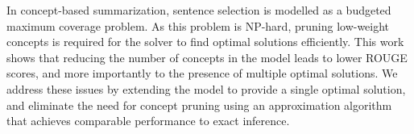 In concept-based summarization, sentence selection is modelled as a budgeted maximum coverage problem. As this problem is NP-hard, pruning low-weight concepts is required for the solver to find optimal solutions efficiently. This work shows that reducing the number of concepts in the model leads to lower ROUGE scores, and more importantly to the presence of multiple optimal solutions. We address these issues by extending the model to provide a single optimal solution, and eliminate the need for concept pruning using an approximation algorithm that achieves comparable performance to exact inference.
